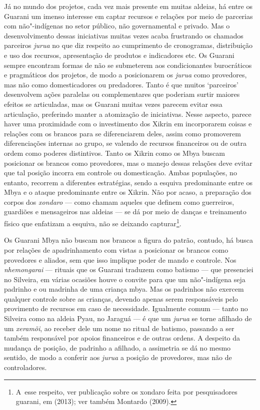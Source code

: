 Já no mundo dos projetos, cada vez mais presente em muitas aldeias, há
entre os Guarani um imenso interesse em captar recursos e relações por
meio de parcerias com não"-indígenas no setor público, não governamental
e privado. Mas o desenvolvimento dessas iniciativas muitas vezes acaba
frustrando os chamados parceiros \emph{jurua} no que diz respeito ao
cumprimento de cronogramas, distribuição e uso dos recursos,
apresentação de produtos e indicadores etc. Os Guarani sempre encontram
formas de não se submeterem aos condicionantes burocráticos e
pragmáticos dos projetos, de modo a posicionarem os \emph{jurua} como
provedores, mas não como domesticadores ou predadores. Tanto é que
muitos `parceiros' desenvolvem ações paralelas ou complementares que
poderiam surtir maiores efeitos se articuladas, mas os Guarani muitas
vezes parecem evitar essa articulação, preferindo manter a atomização
de iniciativas. Nesse aspecto, parece haver uma proximidade com o
investimento dos Xikrin em incorporarem coisas e relações com os
brancos para se diferenciarem deles, assim como promoverem
diferenciações internas ao grupo, se valendo de recursos financeiros ou
de outra ordem como poderes distintivos. Tanto os Xikrin como os Mbya
buscam posicionar os brancos como provedores, mas o manejo dessas
relações deve evitar que tal posição incorra em controle ou
domesticação. Ambas populações, no entanto, recorrem a diferentes
estratégias, sendo a esquiva predominante entre os Mbya e o ataque
predominante entre os Xikrin. Não por acaso, a preparação dos corpos
dos \emph{xondaro} --- como chamam aqueles que definem como guerreiros,
guardiões e mensageiros nas aldeias --- se dá por meio de danças e
treinamento físico que enfatizam a esquiva, não se deixando
capturar\footnote{A~esse respeito, ver publicação sobre os xondaro
feita por pesquisadores guarani, em  (2013); ver também Montardo
(2009).}.

Os Guarani Mbya não buscam nos brancos a figura do patrão, contudo, há
busca por relações de apadrinhamento com vistas a posicionar os brancos
como provedores e aliados, sem que isso implique poder de mando e
controle. Nos \emph{nhemongarai} --- rituais que os Guarani traduzem como
batismo --- que presenciei no Silveira, em várias ocasiões houve o
convite para que um não"-indígena seja padrinho e ou madrinha de uma
criança mbya. Mas os padrinhos não exercem qualquer controle sobre as
crianças, devendo apenas serem responsáveis pelo provimento de recursos
em caso de necessidade. Igualmente comum --- tanto no Silveira como na
aldeia Pyau, no Jaraguá --- é que um \emph{jurua} se torne afilhado de um
\emph{xeramõi}, ao receber dele um nome no ritual de batismo, passando a ser
também responsável por apoios financeiros e de outras ordens. A
despeito da mudança de posição, de padrinho a afilhado, a assimetria se
dá no mesmo sentido, de modo a conferir aos \emph{jurua} a posição de
provedores, mas não de controladores.

